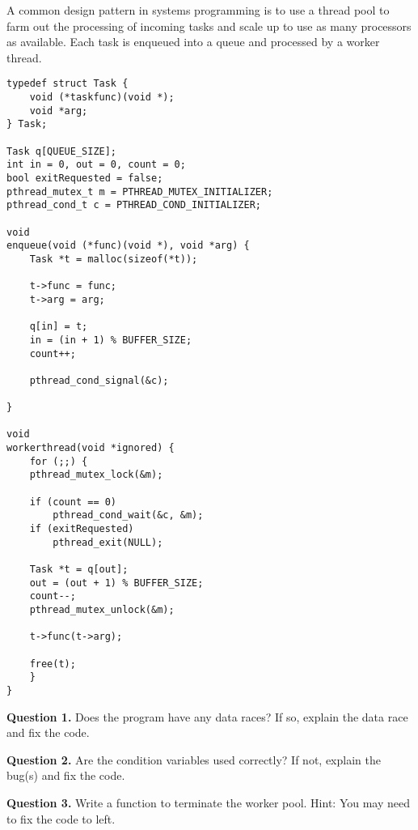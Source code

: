 \documentclass[letterpaper,twocolumn,10pt]{article}
\begin{document}
\pagestyle{fancy}
\fancyfoot[C]{\thepage}

A common design pattern in systems programming is to use a thread pool to farm 
out the processing of incoming tasks and scale up to use as many processors as 
available.  Each task is enqueued into a queue and processed by a worker 
thread.

\begin{lstlisting}[style=CStyle]
typedef struct Task {
    void (*taskfunc)(void *);
    void *arg;
} Task;

Task q[QUEUE_SIZE];
int in = 0, out = 0, count = 0;
bool exitRequested = false;
pthread_mutex_t m = PTHREAD_MUTEX_INITIALIZER;
pthread_cond_t c = PTHREAD_COND_INITIALIZER;

void
enqueue(void (*func)(void *), void *arg) {
    Task *t = malloc(sizeof(*t));

    t->func = func;
    t->arg = arg;

    q[in] = t;
    in = (in + 1) % BUFFER_SIZE;
    count++;

    pthread_cond_signal(&c);

}

void
workerthread(void *ignored) {
    for (;;) {
	pthread_mutex_lock(&m);

	if (count == 0)
	    pthread_cond_wait(&c, &m);
	if (exitRequested)
	    pthread_exit(NULL);

	Task *t = q[out];
	out = (out + 1) % BUFFER_SIZE;
	count--;
	pthread_mutex_unlock(&m);

	t->func(t->arg);

	free(t);
    }
}

\end{lstlisting}

\break

\noindent
\textbf{Question 1.} Does the program have any data races?  If so, explain the 
data race and fix the code.

\vspace{16em}

\noindent
\textbf{Question 2.} Are the condition variables used correctly?  If not, 
explain the bug(s) and fix the code.

\vspace{16em}

\textbf{Question 3.} Write a function to terminate the worker pool.  Hint: You 
may need to fix the code to left.

\vspace{16em}
\end{document}
